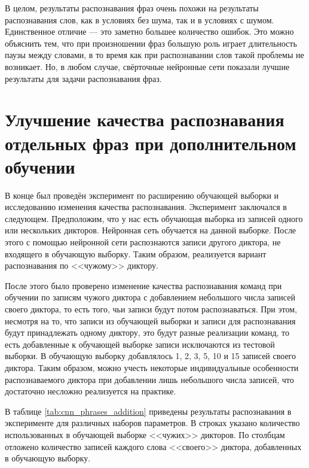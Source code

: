 В целом, результаты распознавания фраз очень похожи на результаты распознавания слов, как в условиях без шума, так и в условиях с шумом.
Единственное отличие --- это заметно большее количество ошибок.
Это можно объяснить тем, что при произношении фраз большую роль играет длительность паузы между словами, в то время как при распознавании слов такой проблемы не возникает.
Но, в любом случае, свёрточные нейронные сети показали лучшие результаты для задачи распознавания фраз.

\clearpage


\section{Улучшение качества распознавания отдельных фраз при дополнительном обучении} \label{sect4_6}

В конце был проведён эксперимент по расширению обучающей выборки и исследованию изменения качества распознавания.
Эксперимент заключался в следующем.
Предположим, что у нас есть обучающая выборка из записей одного или нескольких дикторов.
Нейронная сеть обучается на данной выборке.
После этого с помощью нейронной сети распознаются записи другого диктора, не входящего в обучающую выборку.
Таким образом, реализуется вариант распознавания по <<чужому>> диктору.

После этого было проверено изменение качества распознавания команд при обучении по записям чужого диктора с добавлением небольшого числа записей своего диктора, то есть того, чьи записи будут потом распознаваться.
При этом, несмотря на то, что записи из обучающей выборки и записи для распознавания будут принадлежать одному диктору, это будут разные реализации команд, то есть добавленные к обучающей выборке записи исключаются из тестовой выборки.
В обучающую выборку добавлялось 1, 2, 3, 5, 10 и 15 записей своего диктора.
Таким образом, можно учесть некоторые индивидуальные особенности распознаваемого диктора при добавлении лишь небольшого числа записей, что достаточно несложно реализуется на практике.

В таблице \ref{tab:cnn_phrases_addition} приведены результаты распознавания в эксперименте для различных наборов параметров.
В строках указано количество использованных в обучающей выборке <<чужих>> дикторов.
По столбцам отложено количество записей каждого слова <<своего>> диктора, добавленных в обучающую выборку.

